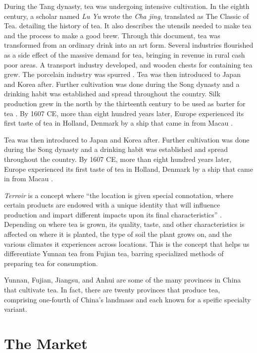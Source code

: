 During the Tang dynasty, tea was undergoing intensive cultivation. In the
eighth century, a scholar named \emph{Lu Yu} wrote the \emph{Cha jing},
translated as The Classic of Tea. detailing the history of tea. It also
describes the utensils needed to make tea and the process to make a good brew.
Through this document, tea was transformed from an ordinary drink into an art
form. Several industries flourished as a side effect of the massive demand for
tea, bringing in revenue in rural cash poor areas. A transport industry
developed, and wooden chests for containing tea grew. The porcelain industry was
spurred . Tea was then introduced to Japan and Korea after. Further cultivation
was done during the Song dynasty and a drinking habit was established and spread
throughout the country. Silk production grew in the north by the thirteenth
century to be used as barter for tea \autocite[2-10]{chow_all_1990}. By 1607 CE,
more than eight hundred years later, Europe experienced its first taste of tea
in Holland, Denmark by a ship that came in from Macau \autocite{chen_tea_2012}.

Tea was then introduced to Japan and Korea after. Further cultivation was done
during the Song dynasty and a drinking habit was established and spread
throughout the country. By 1607 CE, more than eight hundred years later, Europe
experienced its first taste of tea in Holland, Denmark by a ship that came in
from Macau \autocite{chen_tea_2012}.

\emph{Terroir} is a concept where ``the location is given special connotation,
where certain products are endowed with a unique identity that will influence
production and impart different impacts upon its final characteristics''
\autocite{silva_characterization_2014}. Depending on where tea is grown, its
quality, taste, and other characteristics is affected on where it is planted,
the type of soil the plant grows on, and the various climates it experiences
across locations. This is the concept that helps us differentiate Yunnan tea
from Fujian tea, barring specialized methods of preparing tea for consumption.

Yunnan, Fujian, Jiangsu, and Anhui are some of the many provinces in China that
cultivate tea. In fact, there are twenty provinces that produce tea, comprising
one-fourth of China's landmass \autocite{chen_tea_2012} and each known for a
speific specialty variant.

\section{The Market}

